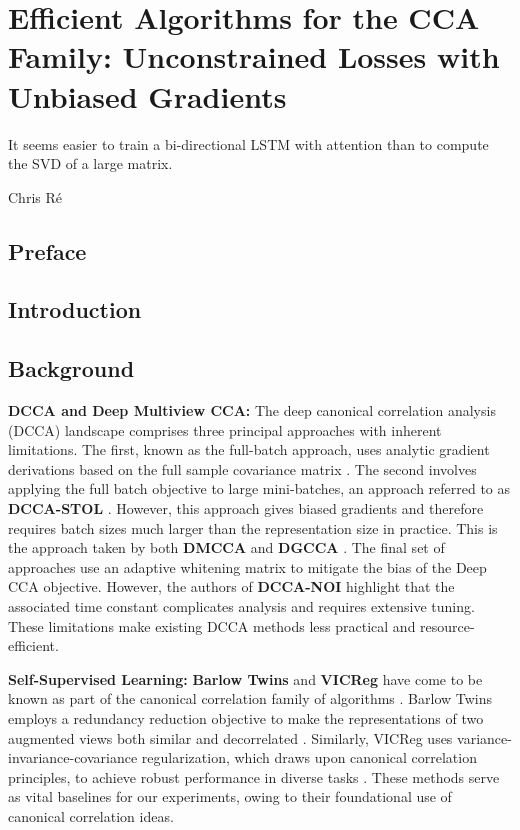 \graphicspath{{chapters/gradient_descent/}}


\chapter{Efficient Algorithms for the CCA Family: Unconstrained Losses with Unbiased Gradients}\label{chap:gradient_descent}
\epigraph{It seems easier to train a bi-directional LSTM with attention than to compute the SVD of a large matrix.\cite{gemp}}{Chris Ré}
\minitoc
\section*{Preface}

\section{Introduction}

\section{Background}

\textbf{DCCA and Deep Multiview CCA:}
The deep canonical correlation analysis (DCCA) landscape comprises three principal approaches with inherent limitations. The first, known as the full-batch approach, uses analytic gradient derivations based on the full sample covariance matrix \citep{andrew2013deep}.
The second involves applying the full batch objective to large mini-batches, an approach referred to as \textbf{DCCA-STOL} \citep{wang2015unsupervised}. However, this approach gives biased gradients and therefore requires batch sizes much larger than the representation size in practice. This is the approach taken by both \textbf{DMCCA} \citep{somandepalli2019multimodal} and \textbf{DGCCA} \citep{benton2017deep} . The final set of approaches use an adaptive whitening matrix \citep{wang2015stochastic, chang2018scalable} to mitigate the bias of the Deep CCA objective. However, the authors of \textbf{DCCA-NOI} highlight that the associated time constant complicates analysis and requires extensive tuning. These limitations make existing DCCA methods less practical and resource-efficient.

\textbf{Self-Supervised Learning:}
\textbf{Barlow Twins} and \textbf{VICReg} have come to be known as part of the canonical correlation family of algorithms \citep{balestriero2023cookbook}. Barlow Twins employs a redundancy reduction objective to make the representations of two augmented views both similar and decorrelated \citep{zbontar2021barlow}. Similarly, VICReg uses variance-invariance-covariance regularization, which draws upon canonical correlation principles, to achieve robust performance in diverse tasks \citep{bardes2021vicreg}. These methods serve as vital baselines for our experiments, owing to their foundational use of canonical correlation ideas.

